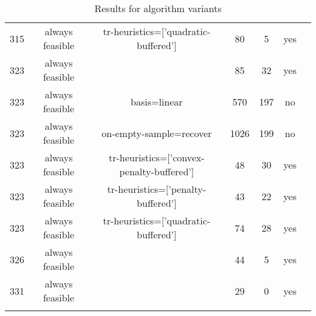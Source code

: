 \begin{footnotesize}
\begin{center}
\begin{longtable}{ccccccc}
315 & always feasible &      tr-heuristics=['quadratic-buffered'] &     80 &      5 &     yes\\
323 & always feasible &                                           &     85 &     32 &     yes\\
323 & always feasible &                              basis=linear &    570 &    197 &      no\\
323 & always feasible &                   on-empty-sample=recover &   1026 &    199 &      no\\
323 & always feasible & tr-heuristics=['convex-penalty-buffered'] &     48 &     30 &     yes\\
323 & always feasible &        tr-heuristics=['penalty-buffered'] &     43 &     22 &     yes\\
323 & always feasible &      tr-heuristics=['quadratic-buffered'] &     74 &     28 &     yes\\
326 & always feasible &                                           &     44 &      5 &     yes\\
331 & always feasible &                                           &     29 &      0 &     yes\\
\caption{Results for algorithm variants}
\label{nonlinear_variants_results}
\end{longtable}
\end{center}
\end{footnotesize}

